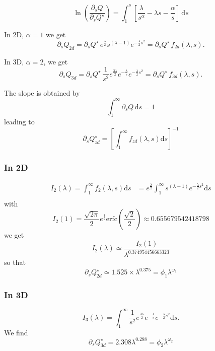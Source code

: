 \documentclass[11pt]{revtex4}
\begin{document}
\begin{equation}
	\ln \left(\dfrac{\partial_s Q}{\partial_sQ^\star}\right) = \int_1^s \left[\dfrac{\lambda}{s^\alpha} - \lambda s -\dfrac{\alpha}{s}\right] \,\mathrm{d}s
\end{equation}

In 2D, $\alpha=1$ we get
\begin{equation}
	\label{eq:dsQ2d}
	\partial_s Q_{2d} = \partial_s Q^\star \, e^{\frac{\lambda}{2}}s^{(\lambda-1)}e^{-\frac{\lambda}{2}s^2} = \partial_s Q^\star \, f_{2d}(\lambda,s).
\end{equation}

In 3D, $\alpha=2$, we get
\begin{equation}
	\label{eq:dsQ3d}
	\partial_s Q_{3d} = \partial_s Q^\star \, \dfrac{1}{s^2} e^{\frac{3\lambda}{2}} e^{-\frac{\lambda}{s}} e^{-\frac{\lambda}{2}s^2} = \partial_s Q^\star \, f_{3d}(\lambda,s).
\end{equation}

The slope is obtained by
$$
	\int_1^\infty \partial_s Q \, \mathrm{d} s = 1
$$
leading to
\begin{equation}
	\partial_sQ^\star_{zd} = \left[ \int_1^\infty f_{zd}(\lambda,s) \mathrm{d}s \right] ^{-1}
\end{equation}

\subsubsection{In 2D}
\begin{equation}
	\begin{array}{rl}
	I_2(\lambda) = \int_1^\infty f_2(\lambda,s) \mathrm{d}s & =  e^{\frac{\lambda}{2}}\int_1^\infty s^{(\lambda-1)}e^{-\frac{\lambda}{2}s^2 } \mathrm{d}s\\
	\end{array}
\end{equation}
with 
$$
	I_2(1) = \dfrac{\sqrt{2\pi}}{2} e^{\frac{1}{2}} \mathrm{erfc}
	\left(\dfrac{\sqrt{2}}{2}\right) \approx 0.655679542418798
$$
we get 
$$
	I_2(\lambda) \simeq \dfrac{I_2(1)}{\lambda^{0.374954456663323}}
$$
so that
\begin{equation}
	\partial_s Q^\star_{2d} \simeq 1.525 \times \lambda^{0.375} = \phi_1 \lambda^{\omega_1}
\end{equation}


\subsubsection{In 3D}
\begin{equation}
	I_3(\lambda) = \int_1^\infty \dfrac{1}{s^2} e^{\frac{3\lambda}{2}} e^{-\frac{\lambda}{s}} e^{-\frac{\lambda}{2}s^2} \mathrm{d}s.
\end{equation}
We find
\begin{equation}
	\partial_s Q^\star_{3d} = 2.308 \lambda^{0.288} = \phi_2 \lambda ^ {\omega_2}
\end{equation}
\end{document}
